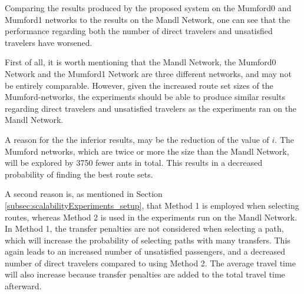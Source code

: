 Comparing the results produced by the proposed system on the Mumford0 and Mumford1 networks to the results on the Mandl Network, one can see that the performance regarding both the number of direct travelers and unsatisfied travelers have worsened. 

First of all, it is worth mentioning that the Mandl Network, the Mumford0 Network and the Mumford1 Network are three different networks, and may not be entirely comparable. However, given the increased route set sizes of the Mumford-networks, the experiments should be able to produce similar results regarding direct travelers and unsatisfied travelers as the experiments ran on the Mandl Network. 

A reason for the the inferior results, may be the reduction of the value of $i$. The Mumford networks, which are twice or more the size than the Mandl Network, will be explored by 3750 fewer ants in total. This results in a decreased probability of finding the best route sets. 

A second reason is, as mentioned in Section \vref{subsec:scalabilityExperiments_setup}, that Method 1 is employed when selecting routes, whereas Method 2 is used in the experiments run on the Mandl Network. In Method 1, the transfer penalties are not considered when selecting a path, which will increase the probability of selecting paths with many transfers. This again leads to an increased number of unsatisfied passengers, and a decreased number of direct travelers compared to using Method 2. The average travel time will also increase because transfer penalties are added to the total travel time afterward.  


